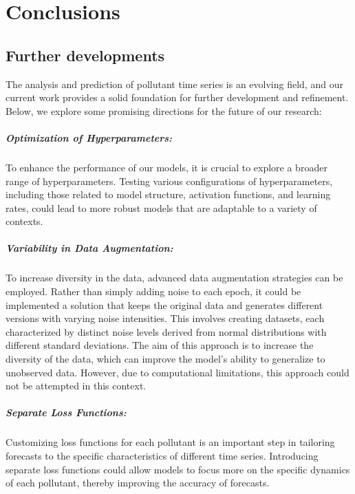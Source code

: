 \chapter{Conclusions}










\section*{Further developments}

The analysis and prediction of pollutant time series is an evolving field, and our current work provides a solid foundation for further development and refinement. Below, we explore some promising directions for the future of our research:

\paragraph{Optimization of Hyperparameters:}
To enhance the performance of our models, it is crucial to explore a broader range of hyperparameters. Testing various configurations of hyperparameters, including those related to model structure, activation functions, and learning rates, could lead to more robust models that are adaptable to a variety of contexts.

\paragraph{Variability in Data Augmentation:}
To increase diversity in the data, advanced data augmentation strategies can be employed. Rather than simply adding noise to each epoch, it could be implemented a solution that keeps the original data and generates different versions with varying noise intensities. This involves creating datasets, each characterized by distinct noise levels derived from normal distributions with different standard deviations. The aim of this approach is to increase the diversity of the data, which can improve the model's ability to generalize to unobserved data. However, due to computational limitations, this approach could not be attempted in this context.

\paragraph{Separate Loss Functions:}
Customizing loss functions for each pollutant is an important step in tailoring forecasts to the specific characteristics of different time series. Introducing separate loss functions could allow models to focus more on the specific dynamics of each pollutant, thereby improving the accuracy of forecasts.


